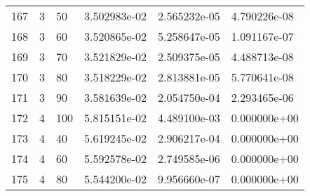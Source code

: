 \documentclass{article}
\begin{document}
\begin{center}
\begin{tabular}{llllll}
167 &         3 &         50 &  3.502983e-02 &          2.565232e-05 &                      4.790226e-08 \\
168 &         3 &         60 &  3.520865e-02 &          5.258647e-05 &                      1.091167e-07 \\
169 &         3 &         70 &  3.521829e-02 &          2.509375e-05 &                      4.488713e-08 \\
170 &         3 &         80 &  3.518229e-02 &          2.813881e-05 &                      5.770641e-08 \\
171 &         3 &         90 &  3.581639e-02 &          2.054750e-04 &                      2.293465e-06 \\
172 &         4 &        100 &  5.815151e-02 &          4.489100e-03 &                      0.000000e+00 \\
173 &         4 &         40 &  5.619245e-02 &          2.906217e-04 &                      0.000000e+00 \\
174 &         4 &         60 &  5.592578e-02 &          2.749585e-06 &                      0.000000e+00 \\
175 &         4 &         80 &  5.544200e-02 &          9.956660e-07 &                      0.000000e+00 \\
\bottomrule
\end{tabular}
\end{center}
\end{document}
